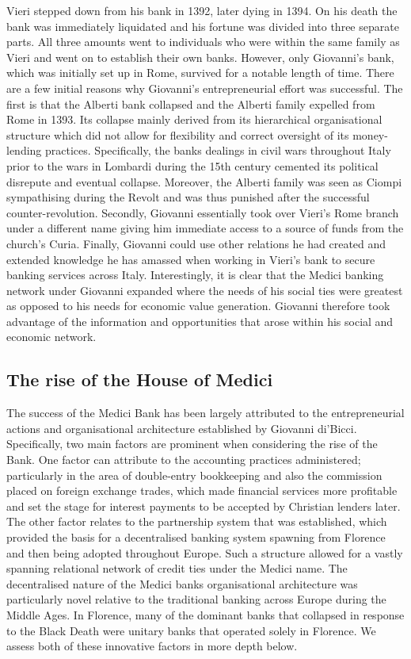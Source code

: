 Vieri stepped down from his bank in 1392, later dying in 1394. On his death the bank was immediately liquidated and his fortune was divided into three separate parts. All three amounts went to individuals who were within the same family as Vieri and went on to establish their own banks. However, only Giovanni's bank, which was initially set up in Rome, survived for a notable length of time. There are a few initial reasons why Giovanni's entrepreneurial effort was successful. The first is that the Alberti bank collapsed and the Alberti family expelled from Rome in 1393. Its collapse mainly derived from its hierarchical organisational structure which did not allow for flexibility and correct oversight of its money-lending practices. Specifically, the banks dealings in civil wars throughout Italy prior to the wars in Lombardi during the 15th century cemented its political disrepute and eventual collapse. Moreover, the Alberti family was seen as Ciompi sympathising during the Revolt and was thus punished after the successful counter-revolution. Secondly, Giovanni essentially took over Vieri's Rome branch under a different name giving him immediate access to a source of funds from the church's Curia. Finally, Giovanni could use other relations he had created and extended knowledge he has amassed when working in Vieri's bank to secure banking services across Italy. Interestingly, it is clear that the Medici banking network under Giovanni expanded where the needs of his social ties were greatest as opposed to his needs for economic value generation. Giovanni therefore took advantage of the information and opportunities that arose within his social and economic network.

\subsection{The rise of the House of Medici}

The success of the Medici Bank has been largely attributed to the entrepreneurial actions and organisational architecture established by Giovanni di'Bicci. Specifically, two main factors are prominent when considering the rise of the Bank. One factor can attribute to the accounting practices administered; particularly in the area of double-entry bookkeeping and also the commission placed on foreign exchange trades, which made financial services more profitable and set the stage for interest payments to be accepted by Christian lenders later. The other factor relates to the partnership system that was established, which provided the basis for a decentralised banking system spawning from Florence and then being adopted throughout Europe. Such a structure allowed for a vastly spanning relational network of credit ties under the Medici name. The decentralised nature of the Medici banks organisational architecture was particularly novel relative to the traditional banking across Europe during the Middle Ages. In Florence, many of the dominant banks that collapsed in response to the Black Death were unitary banks that operated solely in Florence. We assess both of these innovative factors in more depth below.

